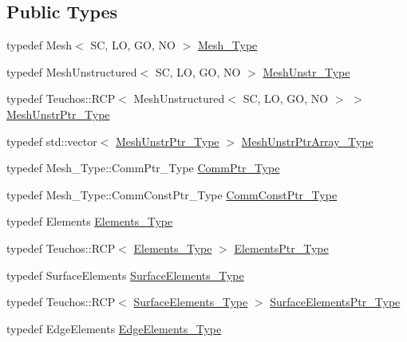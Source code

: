\subsection*{Public Types}
\begin{DoxyCompactItemize}
\item 
typedef Mesh$<$ SC, LO, GO, NO $>$ \hyperlink{classFEDD_1_1RefinementFactory_a19f6ea9d9d873657041004fa12f76ac5}{Mesh\+\_\+\+Type}
\item 
typedef Mesh\+Unstructured$<$ SC, LO, GO, NO $>$ \hyperlink{classFEDD_1_1RefinementFactory_af03eee08be24542da73ba33195f14aba}{Mesh\+Unstr\+\_\+\+Type}
\item 
typedef Teuchos\+::\+R\+CP$<$ Mesh\+Unstructured$<$ SC, LO, GO, NO $>$ $>$ \hyperlink{classFEDD_1_1RefinementFactory_a1a278d01c278972af01f2996247af8ac}{Mesh\+Unstr\+Ptr\+\_\+\+Type}
\item 
typedef std\+::vector$<$ \hyperlink{classFEDD_1_1RefinementFactory_a1a278d01c278972af01f2996247af8ac}{Mesh\+Unstr\+Ptr\+\_\+\+Type} $>$ \hyperlink{classFEDD_1_1RefinementFactory_a772a738296d703be721b9b1c877f1a9e}{Mesh\+Unstr\+Ptr\+Array\+\_\+\+Type}
\item 
typedef Mesh\+\_\+\+Type\+::\+Comm\+Ptr\+\_\+\+Type \hyperlink{classFEDD_1_1RefinementFactory_ad2163b2c380d83b6b28a695f6f8e8a56}{Comm\+Ptr\+\_\+\+Type}
\item 
typedef Mesh\+\_\+\+Type\+::\+Comm\+Const\+Ptr\+\_\+\+Type \hyperlink{classFEDD_1_1RefinementFactory_a58381e0786c65ec61d11bc73c224b45a}{Comm\+Const\+Ptr\+\_\+\+Type}
\item 
typedef Elements \hyperlink{classFEDD_1_1RefinementFactory_a0879b04ac1b1830fae7d6a7e29d36000}{Elements\+\_\+\+Type}
\item 
typedef Teuchos\+::\+R\+CP$<$ \hyperlink{classFEDD_1_1RefinementFactory_a0879b04ac1b1830fae7d6a7e29d36000}{Elements\+\_\+\+Type} $>$ \hyperlink{classFEDD_1_1RefinementFactory_a0994b5b7b6d080048673941251999f2e}{Elements\+Ptr\+\_\+\+Type}
\item 
typedef Surface\+Elements \hyperlink{classFEDD_1_1RefinementFactory_ac050bc27156fc5a1e8bf0e01381c33c4}{Surface\+Elements\+\_\+\+Type}
\item 
typedef Teuchos\+::\+R\+CP$<$ \hyperlink{classFEDD_1_1RefinementFactory_ac050bc27156fc5a1e8bf0e01381c33c4}{Surface\+Elements\+\_\+\+Type} $>$ \hyperlink{classFEDD_1_1RefinementFactory_a1067ba23325b19eae16a864f25f7d68f}{Surface\+Elements\+Ptr\+\_\+\+Type}
\item 
typedef Edge\+Elements \hyperlink{classFEDD_1_1RefinementFactory_a11b30196ff403358f3540117f09b6963}{Edge\+Elements\+\_\+\+Type}

\end{DoxyCompactItemize}
